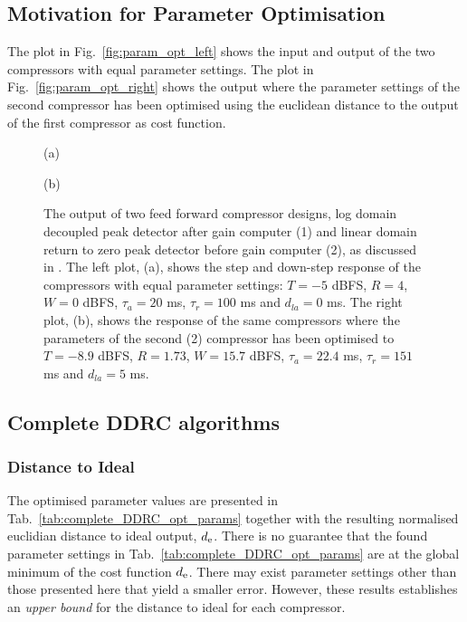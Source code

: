 \documentclass[../main2.tex]{subfiles}
\providecommand{\rootdir}{..}
\begin{document}
\subsection{Motivation for Parameter Optimisation}
The plot in Fig.~\ref{fig:param_opt_left} shows the input and output of the two compressors with equal parameter settings. The plot in Fig.~\ref{fig:param_opt_right} shows the output where the parameter settings of the second compressor has been optimised using the euclidean distance to the output of the first compressor as cost function. 
\begin{figure}[ht]
\captionsetup*{justification=centering}
\begin{minipage}[t]{.5\textwidth}
 \centering

\caption*{(a)} 
\label{fig:param_opt_left}
\end{minipage}%
\begin{minipage}[t]{.5\textwidth}
\centering

\caption*{(b)} 
\label{fig:param_opt_right}
\end{minipage}
\caption{The output of two feed forward compressor designs, log domain decoupled peak detector after gain computer (1) and linear domain return to zero peak detector before gain computer (2), as discussed in \cite{reiss2012tutorial}. The left plot, (a), shows the step and down-step response of the compressors with equal parameter settings: $T = -5$ dBFS, $R=4$, $W=0$ dBFS, $\tau_a = 20$ ms, $\tau_r = 100$ ms and $d_{la}=0$ ms. The right plot, (b), shows the response of the same compressors where the parameters of the second (2) compressor has been optimised to $T = -8.9$ dBFS, $R=1.73$, $W=15.7$ dBFS, $\tau_a = 22.4$ ms, $\tau_r = 151$ ms and $d_{la}=5$ ms.}
\label{fig:param_opt}
\end{figure}

\subsection{Complete DDRC algorithms}

\subsubsection{Distance to Ideal}
The optimised parameter values are presented in Tab.~\ref{tab:complete_DDRC_opt_params} together with the resulting normalised euclidian distance to ideal output, $d_\text{e}$. There is no guarantee that the found parameter settings in Tab.~\ref{tab:complete_DDRC_opt_params} are at the global minimum of the cost function $d_\text{e}$. There may exist parameter settings other than those presented here that yield a smaller error. However, these results establishes an \emph{upper bound} for the distance to ideal for each compressor.
\end{document}
